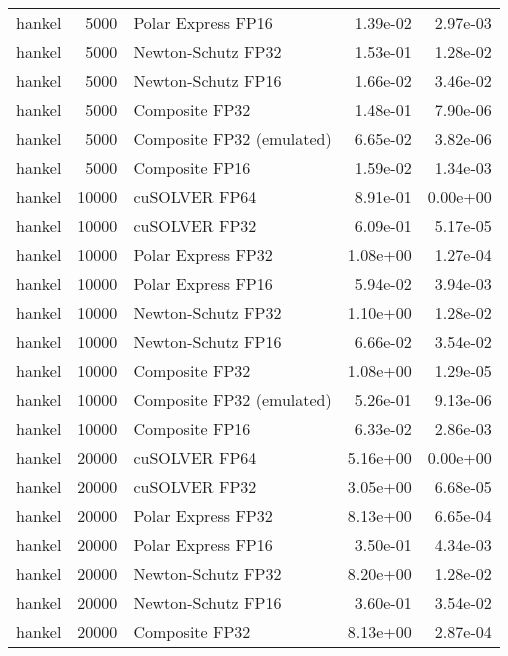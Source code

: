 \begin{table}
\begin{tabular}{lrlrr}
   hankel &  5000 &        Polar Express FP16 &  1.39e-02 &        2.97e-03 \\
   hankel &  5000 &        Newton-Schutz FP32 &  1.53e-01 &        1.28e-02 \\
   hankel &  5000 &        Newton-Schutz FP16 &  1.66e-02 &        3.46e-02 \\
   hankel &  5000 &            Composite FP32 &  1.48e-01 &        7.90e-06 \\
   hankel &  5000 & Composite FP32 (emulated) &  6.65e-02 &        3.82e-06 \\
   hankel &  5000 &            Composite FP16 &  1.59e-02 &        1.34e-03 \\
   hankel & 10000 &             cuSOLVER FP64 &  8.91e-01 &        0.00e+00 \\
   hankel & 10000 &             cuSOLVER FP32 &  6.09e-01 &        5.17e-05 \\
   hankel & 10000 &        Polar Express FP32 &  1.08e+00 &        1.27e-04 \\
   hankel & 10000 &        Polar Express FP16 &  5.94e-02 &        3.94e-03 \\
   hankel & 10000 &        Newton-Schutz FP32 &  1.10e+00 &        1.28e-02 \\
   hankel & 10000 &        Newton-Schutz FP16 &  6.66e-02 &        3.54e-02 \\
   hankel & 10000 &            Composite FP32 &  1.08e+00 &        1.29e-05 \\
   hankel & 10000 & Composite FP32 (emulated) &  5.26e-01 &        9.13e-06 \\
   hankel & 10000 &            Composite FP16 &  6.33e-02 &        2.86e-03 \\
   hankel & 20000 &             cuSOLVER FP64 &  5.16e+00 &        0.00e+00 \\
   hankel & 20000 &             cuSOLVER FP32 &  3.05e+00 &        6.68e-05 \\
   hankel & 20000 &        Polar Express FP32 &  8.13e+00 &        6.65e-04 \\
   hankel & 20000 &        Polar Express FP16 &  3.50e-01 &        4.34e-03 \\
   hankel & 20000 &        Newton-Schutz FP32 &  8.20e+00 &        1.28e-02 \\
   hankel & 20000 &        Newton-Schutz FP16 &  3.60e-01 &        3.54e-02 \\
   hankel & 20000 &            Composite FP32 &  8.13e+00 &        2.87e-04 \\

\end{tabular}
\end{table}
